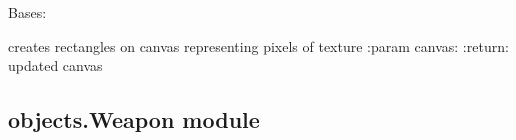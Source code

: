 \documentclass[letterpaper,10pt,english]{sphinxmanual}
\begin{document}
\begin{fulllineitems}
\label{\detokenize{objects:objects.TextureStripe.TextureStripe}}
\pysigstartsignatures
{}
\pysigstopsignatures
\sphinxAtStartPar
Bases: 

\begin{fulllineitems}
\label{\detokenize{objects:objects.TextureStripe.TextureStripe.render}}
\pysigstartsignatures
{}
\pysigstopsignatures
\sphinxAtStartPar
creates rectangles on canvas representing pixels of texture
:param canvas:
:return: updated canvas

\end{fulllineitems}


\end{fulllineitems}



\subsection{objects.Weapon module}
\label{\detokenize{objects:module-objects.Weapon}}\label{\detokenize{objects:objects-weapon-module}}
\end{document}
